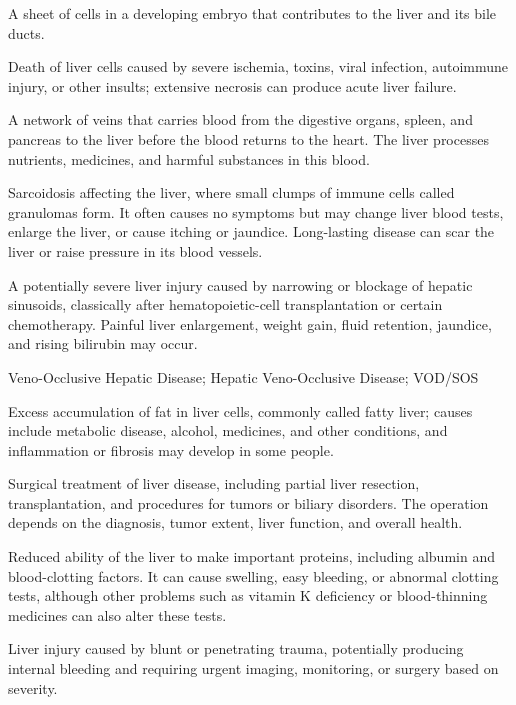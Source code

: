  A sheet of cells in a developing embryo that contributes to the liver and its bile ducts.

 Death of liver cells caused by severe ischemia, toxins, viral infection, autoimmune injury, or other insults; extensive necrosis can produce acute liver failure.

 A network of veins that carries blood from the digestive organs, spleen, and pancreas to the liver before the blood returns to the heart. The liver processes nutrients, medicines, and harmful substances in this blood.

 Sarcoidosis affecting the liver, where small clumps of
immune cells called granulomas form. It often causes no symptoms but may change liver
blood tests, enlarge the liver, or cause itching or jaundice. Long-lasting disease can
scar the liver or raise pressure in its blood vessels.

 A potentially severe liver injury caused by narrowing or blockage of hepatic sinusoids, classically after hematopoietic-cell transplantation or certain chemotherapy. Painful liver enlargement, weight gain, fluid retention, jaundice, and rising bilirubin may occur.

\synonyms
Veno-Occlusive Hepatic Disease; Hepatic Veno-Occlusive Disease; VOD/SOS

 Excess accumulation of fat in liver cells, commonly called fatty liver; causes include metabolic disease, alcohol, medicines, and other conditions, and inflammation or fibrosis may develop in some people.

 Surgical treatment of liver disease, including partial liver resection, transplantation, and
procedures for tumors or biliary disorders. The operation depends on the diagnosis, tumor extent, liver function, and
overall health.

 Reduced ability of the liver to make important proteins, including albumin and blood-clotting factors. It can cause swelling, easy bleeding, or abnormal clotting tests, although other problems such as vitamin K deficiency or blood-thinning medicines can also alter these tests.

 Liver injury caused by blunt or penetrating trauma, potentially producing internal bleeding and requiring urgent imaging, monitoring, or surgery based on severity.

